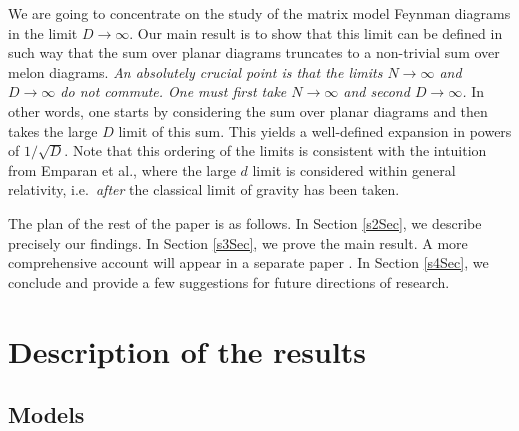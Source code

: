 \documentclass[12pt]{article}
\numberwithin{equation}{section}
\begin{document}
We are going to concentrate on the study of the matrix model Feynman diagrams in the limit $D\rightarrow\infty$. Our main result is to show that this limit can be defined in such way that the sum over planar diagrams truncates to a non-trivial sum over melon diagrams. \emph{An absolutely crucial point is that the limits $N\rightarrow\infty$ and $D\rightarrow\infty$ do not commute. One must first take $N\rightarrow\infty$ and second $D\rightarrow\infty$.} In other words, one starts by considering the sum over planar diagrams and then takes the large $D$ limit of this sum. This yields a well-defined expansion in powers of $1/\sqrt{D}$. Note that this ordering of the limits is consistent with the intuition from Emparan et al., where the large $d$ limit is considered within general relativity, i.e.\ \emph{after} the classical limit of gravity has been taken.

The plan of the rest of the paper is as follows. In Section \ref{s2Sec}, we describe precisely our findings. In Section \ref{s3Sec}, we prove the main result. A more comprehensive account will appear in a separate paper \cite{Fernew}. In Section \ref{s4Sec}, we conclude and provide a few suggestions for future directions of research.

%
\section{\label{s2Sec} Description of the results}
%

\subsection{\label{ModelsSec} Models}
\end{document}
